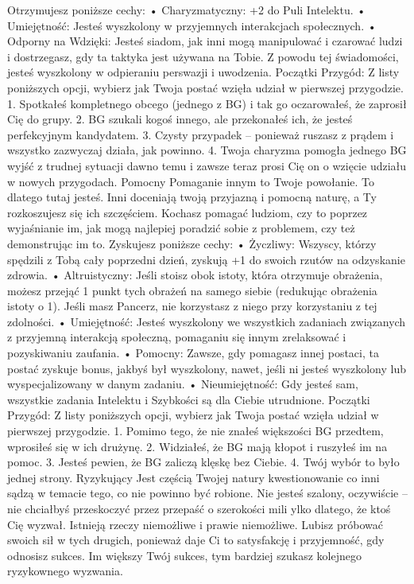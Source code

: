 Otrzymujesz poniższe cechy:
    • Charyzmatyczny: +2 do Puli Intelektu.
    • Umiejętność: Jesteś wyszkolony w przyjemnych interakcjach społecznych.
    • Odporny na Wdzięki: Jesteś siadom, jak inni mogą manipulować i czarować ludzi i dostrzegasz, gdy ta taktyka jest używana na Tobie. Z powodu tej świadomości, jesteś wyszkolony w odpieraniu perswazji i uwodzenia.
Początki Przygód: Z listy poniższych opcji, wybierz jak Twoja postać wzięła udział w pierwszej przygodzie.
1. Spotkałeś kompletnego obcego (jednego z BG) i tak go oczarowałeś, że zaprosił Cię do grupy.
2. BG szukali kogoś innego, ale przekonałeś ich, że jesteś perfekcyjnym kandydatem.
3. Czysty przypadek – ponieważ ruszasz z prądem i wszystko zazwyczaj działa, jak powinno.
4. Twoja charyzma pomogła jednego BG wyjść z trudnej sytuacji dawno temu i zawsze teraz prosi Cię on o wzięcie udziału w nowych przygodach.
Pomocny
Pomaganie innym to Twoje powołanie. To dlatego tutaj jesteś. Inni doceniają twoją przyjazną i pomocną naturę, a Ty rozkoszujesz się ich szczęściem. Kochasz pomagać ludziom, czy to poprzez wyjaśnianie im, jak mogą najlepiej poradzić sobie z problemem, czy też demonstrując im to.
Zyskujesz poniższe cechy:
    • Życzliwy: Wszyscy, którzy spędzili z Tobą cały poprzedni dzień, zyskują +1 do swoich rzutów na odzyskanie zdrowia.
    • Altruistyczny: Jeśli stoisz obok istoty, która otrzymuje obrażenia, możesz przejąć 1 punkt tych obrażeń na samego siebie (redukując obrażenia istoty o 1). Jeśli masz Pancerz, nie korzystasz z niego przy korzystaniu z tej zdolności.
    • Umiejętność: Jesteś wyszkolony we wszystkich zadaniach związanych z przyjemną interakcją społeczną, pomaganiu się innym zrelaksować i pozyskiwaniu zaufania.
    • Pomocny: Zawsze, gdy pomagasz innej postaci, ta postać zyskuje bonus, jakbyś był wyszkolony, nawet, jeśli ni jesteś wyszkolony lub wyspecjalizowany w danym zadaniu.
    • Nieumiejętność: Gdy jesteś sam, wszystkie zadania Intelektu i Szybkości są dla Ciebie utrudnione.
Początki Przygód: Z listy poniższych opcji, wybierz jak Twoja postać wzięła udział w pierwszej przygodzie.
1. Pomimo tego, że nie znałeś większości BG przedtem, wprosiłeś się w ich drużynę.
2. Widziałeś, że BG mają kłopot i ruszyłeś im na pomoc.
3. Jesteś pewien, że BG zaliczą klęskę bez Ciebie.
4. Twój wybór to było  jednej strony.
Ryzykujący
Jest częścią Twojej natury kwestionowanie co inni sądzą w temacie tego, co nie powinno być robione. Nie jesteś szalony, oczywiście – nie chciałbyś przeskoczyć przez przepaść o szerokości mili ylko dlatego, że ktoś Cię wyzwał. Istnieją rzeczy niemożliwe i prawie niemożliwe. Lubisz próbować swoich sił w tych drugich, ponieważ daje Ci to satysfakcję i przyjemność, gdy odnosisz sukces. Im większy Twój sukces, tym bardziej szukasz kolejnego ryzykownego wyzwania.
